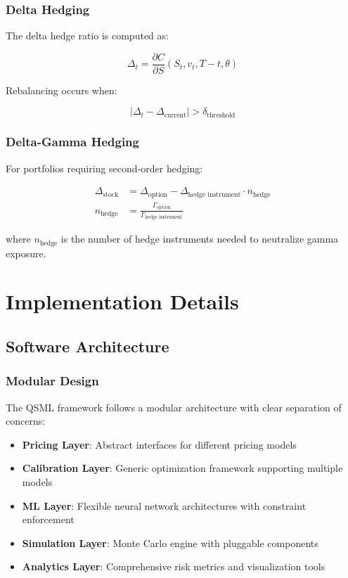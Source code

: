 \documentclass[12pt,a4paper]{article}
\begin{document}
\subsubsection{Delta Hedging}

The delta hedge ratio is computed as:

\begin{equation}
\Delta_t = \frac{\partial C}{\partial S}(S_t, v_t, T-t, \theta)
\end{equation}

Rebalancing occurs when:

\begin{equation}
|\Delta_t - \Delta_{\text{current}}| > \delta_{\text{threshold}}
\end{equation}

\subsubsection{Delta-Gamma Hedging}

For portfolios requiring second-order hedging:

\begin{align}
\Delta_{\text{stock}} &= \Delta_{\text{option}} - \Delta_{\text{hedge instrument}} \cdot n_{\text{hedge}} \\
n_{\text{hedge}} &= \frac{\Gamma_{\text{option}}}{\Gamma_{\text{hedge instrument}}}
\end{align}

where $n_{\text{hedge}}$ is the number of hedge instruments needed to neutralize gamma exposure.

\section{Implementation Details}

\subsection{Software Architecture}

\subsubsection{Modular Design}

The QSML framework follows a modular architecture with clear separation of concerns:

\begin{itemize}
    \item \textbf{Pricing Layer}: Abstract interfaces for different pricing models
    \item \textbf{Calibration Layer}: Generic optimization framework supporting multiple models
    \item \textbf{ML Layer}: Flexible neural network architectures with constraint enforcement
    \item \textbf{Simulation Layer}: Monte Carlo engine with pluggable components
    \item \textbf{Analytics Layer}: Comprehensive risk metrics and visualization tools
\end{itemize}
\end{document}
